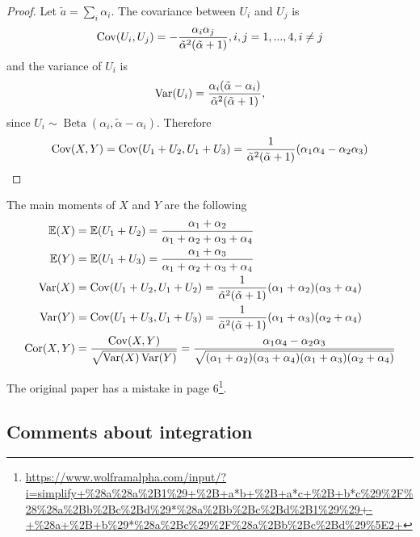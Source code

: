 \begin{proof}

  Let $\tilde{a} = \sum_i \alpha_i$. The covariance between $U_i$ and $U_j$ is \cite[]{lin2016dirichlet} 
\begin{equation}
  \operatorname{Cov}(U_i, U_j) = - \frac{\alpha_i\alpha_j}{\tilde{\alpha}^2(\tilde{\alpha}+1)}, i,j = 1,...,4, i \neq j
\end{equation} 
and the variance of $U_i$ is 
\begin{equation}
  \operatorname{Var}(U_i) = \frac{\alpha_i(\tilde{\alpha}-\alpha_i)}{\tilde{\alpha}^2(\tilde{\alpha}+1)},
\end{equation}
since $U_i \sim \operatorname{Beta}(\alpha_i, \tilde{\alpha} -\alpha_i)$.
Therefore 
\begin{equation}
  \operatorname{Cov}(X,Y) = \operatorname{Cov}(U_1+U_2, U_1+U_3) = \frac{1}{\tilde{\alpha}^2(\tilde{\alpha}+1)}(\alpha_1\alpha_4 - \alpha_2\alpha_3)
\end{equation}
  
\end{proof}

The main moments of $X$ and $Y$ are the following 
\begin{align*}
    \mathbb{E}(X) &= \mathbb{E}(U_1 + U_2) = \frac{\alpha_1+\alpha_2}{\alpha_1+\alpha_2+\alpha_3+\alpha_4} \\
    \mathbb{E}(Y) &= \mathbb{E}(U_1 + U_3) = \frac{\alpha_1+\alpha_3}{\alpha_1+\alpha_2+\alpha_3+\alpha_4} \\
    \operatorname{Var}(X) &= \operatorname{Cov}(U_1+U_2, U_1+U_2) = \frac{1}{\tilde{\alpha}^2(\tilde{\alpha}+1)}(\alpha_1+\alpha_2)(\alpha_3 + \alpha_4) \\
    \operatorname{Var}(Y) &= \operatorname{Cov}(U_1+U_3, U_1+U_3) = \frac{1}{\tilde{\alpha}^2(\tilde{\alpha}+1)}(\alpha_1+\alpha_3)(\alpha_2 + \alpha_4)  \\  
    \operatorname{Cor}(X,Y) &= \frac{\operatorname{Cov}(X,Y)}{\sqrt{\operatorname{Var}(X)\operatorname{Var}(Y)}} = \frac{\alpha_1\alpha_4 - \alpha_2\alpha_3}{\sqrt{(\alpha_1+\alpha_2)(\alpha_3+\alpha_4)(\alpha_1+\alpha_3)(\alpha_2+\alpha_4)}}
\end{align*}

The original paper has a mistake in page
6\footnote{\url{https://www.wolframalpha.com/input/?i=simplify+\%28a\%28a\%2B1\%29+\%2B+a*b+\%2B+a*c+\%2B+b*c\%29\%2F\%28\%28a\%2Bb\%2Bc\%2Bd\%29*\%28a\%2Bb\%2Bc\%2Bd\%2B1\%29\%29+-+\%28a+\%2B+b\%29*\%28a\%2Bc\%29\%2F\%28a\%2Bb\%2Bc\%2Bd\%29\%5E2+}}.

\subsection{Comments about integration}

